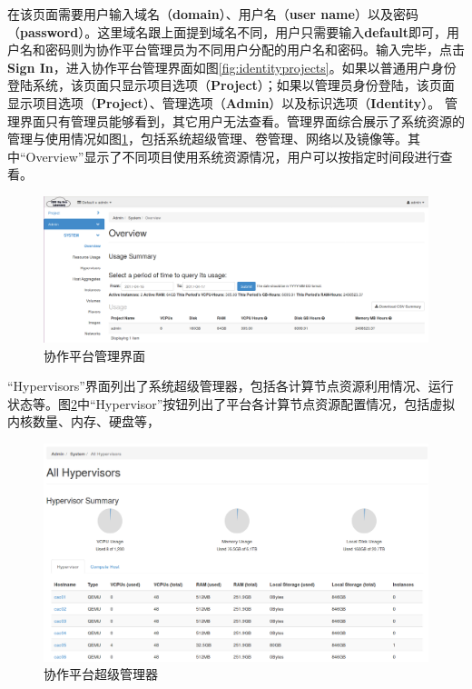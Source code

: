 \documentclass[12pt]{ctexart}%
\begin{document}
在该页面需要用户输入域名（\textbf{domain}）、用户名（\textbf{user name}）以及密码（\textbf{password}）。这里域名跟上面提到域名不同，用户只需要输入\textbf{default}即可，用户名和密码则为协作平台管理员为不同用户分配的用户名和密码。输入完毕，点击\textbf{Sign In}，进入协作平台管理界面如图\ref{fig:identityprojects}。如果以普通用户身份登陆系统，该页面只显示项目选项（\textbf{Project}）；如果以管理员身份登陆，该页面显示项目选项（\textbf{Project}）、管理选项（\textbf{Admin}）以及标识选项（\textbf{Identity}）。
管理界面只有管理员能够看到，其它用户无法查看。管理界面综合展示了系统资源的管理与使用情况如图\ref{fig:adminsystemoverview}，包括系统超级管理、卷管理、网络以及镜像等。其中``Overview''显示了不同项目使用系统资源情况，用户可以按指定时间段进行查看。
\begin{figure}[!htb]
\centering
\includegraphics[width=6in]{./figures/Admin_System_Overview}
\caption{协作平台管理界面}
\label{fig:adminsystemoverview}
\end{figure}

``Hypervisors''界面列出了系统超级管理器，包括各计算节点资源利用情况、运行状态等。图\ref{fig:adminsystemhypervisors}中``Hypervisor''按钮列出了平台各计算节点资源配置情况，包括虚拟内核数量、内存、硬盘等，
\begin{figure}[!htb]
\centering
\includegraphics[width=6in]{./figures/Admin_System_Hypervisors}
\caption{协作平台超级管理器}
\label{fig:adminsystemhypervisors}
\end{figure}
\end{document}
